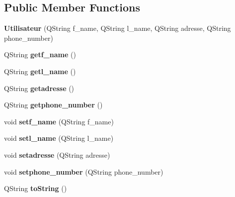 \subsection*{Public Member Functions}
\begin{DoxyCompactItemize}
\item 
\mbox{\label{class_utilisateur_a0fe9888099a1e40be648157536f645be}} 
{\bfseries Utilisateur} (Q\+String f\+\_\+name, Q\+String l\+\_\+name, Q\+String adresse, Q\+String phone\+\_\+number)
\item 
\mbox{\label{class_utilisateur_ad5f75703c1b9b5e4a66490a4641deb33}} 
Q\+String {\bfseries getf\+\_\+name} ()
\item 
\mbox{\label{class_utilisateur_a8ee5dd09a7d1678a4a98a9c4820ac007}} 
Q\+String {\bfseries getl\+\_\+name} ()
\item 
\mbox{\label{class_utilisateur_aae3c96e98522e6bfb9f97991e454f2bd}} 
Q\+String {\bfseries getadresse} ()
\item 
\mbox{\label{class_utilisateur_af2657b63d087c8e8430b8dc00d2117aa}} 
Q\+String {\bfseries getphone\+\_\+number} ()
\item 
\mbox{\label{class_utilisateur_a79e3806e0aa6f5d263d03870621d3e59}} 
void {\bfseries setf\+\_\+name} (Q\+String f\+\_\+name)
\item 
\mbox{\label{class_utilisateur_ac3d130b027779c9aaaf55fab9a62ace6}} 
void {\bfseries setl\+\_\+name} (Q\+String l\+\_\+name)
\item 
\mbox{\label{class_utilisateur_a7047623a06539a397d1457d312985ba7}} 
void {\bfseries setadresse} (Q\+String adresse)
\item 
\mbox{\label{class_utilisateur_aec930972cb1ee96c8352a80d1cff78e7}} 
void {\bfseries setphone\+\_\+number} (Q\+String phone\+\_\+number)
\item 
\mbox{\label{class_utilisateur_a99523ad9c5e75e677240da2f3c6b63aa}} 
Q\+String {\bfseries to\+String} ()
\end{DoxyCompactItemize}


